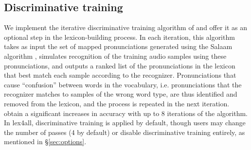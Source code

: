 \documentclass[11pt]{article}
\begin{document}
%
%



\subsection{Discriminative training}
\label{sec:discrimtrain}
We implement the iterative discriminative training algorithm of  and offer it as an optional step in the lexicon-building process. In each iteration, this algorithm takes as input the set of mapped pronunciations generated using the Salaam algorithm \cite{Qiao10}, simulates recognition of the training audio samples using these pronunciations, and outputs a ranked list of the pronunciations in the lexicon that best match each sample according to the recognizer. Pronunciations that cause ``confusion'' between words in the vocabulary, i.e. pronunciations that the recognizer matches to samples of the wrong word type, are thus identified and removed from the lexicon, and the process is repeated in the next iteration.  obtain a significant increases in accuracy with up to 8 iterations of the algorithm. In lex4all, discriminative training is applied by default, though users may change the number of passes (4 by default) or disable discriminative training entirely, as mentioned in \S\ref{sec:options}.
\end{document}
